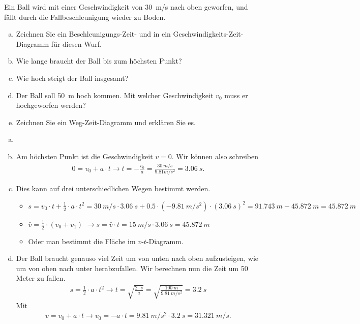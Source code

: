 

\begin{aufgabe}
Ein Ball wird mit einer Geschwindigkeit von \SI{30}{m/s} nach oben geworfen, und fällt
durch die Fallbeschleunigung wieder zu Boden.
\begin{enumerate}[a)]
	\item Zeichnen Sie ein Beschleunigungs-Zeit- und in ein Geschwindigkeits-Zeit-Diagramm für diesen Wurf.
	\item Wie lange braucht der Ball bis zum höchsten Punkt?
	\item Wie hoch steigt der Ball insgesamt?
	\item Der Ball soll \SI{50}{m} hoch kommen. Mit welcher Geschwindigkeit $v_0$ muss er hochgeworfen werden?
	\item Zeichnen Sie ein Weg-Zeit-Diagramm und erklären Sie es.
\end{enumerate}


\begin{loesung}
	\begin{enumerate}[a)]
		\item
		\item Am höchsten Punkt ist die Geschwindigkeit $v=0$. 
		Wir können also schreiben
		\begin{eqnarray*}
		0 = v_0 + a\cdot t \to t=-\frac{v_0}{a}=\frac{\SI{30}{m/s}}{{9.81}{m/s^2}}=\SI{3.06}{s}.
		\end{eqnarray*}

	\item Dies kann auf drei unterschiedlichen Wegen bestimmt werden. 
\begin{itemize}
	\item $s=v_0\cdot t +\frac{1}{2}\cdot a \cdot t^2 = \SI{30}{m/s}\cdot\SI{3.06}{s}+0.5\cdot(\SI{-9.81}{m/s^2})\cdot(\SI{3.06}{s})^2=\SI{91.743}{m}-\SI{45.872}{m}=\SI{45.872}{m}$
	\item $\bar{v}=\frac{1}{2}\cdot (v_0+v_1)$ $\to s=\bar{v}\cdot t=\SI{15}{m/s}\cdot\SI{3.06}{s}=\SI{45.872}{m}$
	\item Oder man bestimmt die Fläche im $v$-$t$-Diagramm.
\end{itemize}
	\item Der Ball braucht genauso viel Zeit um von unten nach oben aufzusteigen, wie um von oben nach unter herabzufallen.
		Wir berechnen nun die Zeit um 50 Meter zu fallen.
		\begin{eqnarray*}
			s=\frac{1}{2}\cdot a\cdot t^2 \to t=\sqrt{\frac{2\cdot s}{a}}=\sqrt{\frac{\SI{100}{m}}{\SI{9.81}{m/s^2}}}=\SI{3.2}{s}
		\end{eqnarray*}
		Mit
		\begin{eqnarray*}
			v=v_0 + a\cdot t\to v_0=-a\cdot t=\SI{9.81}{m/s^2}\cdot\SI{3.2}{s}=\SI{31.321}{m/s}\text{.}
		\end{eqnarray*}


\end{enumerate}
\end{loesung}
\end{aufgabe}
